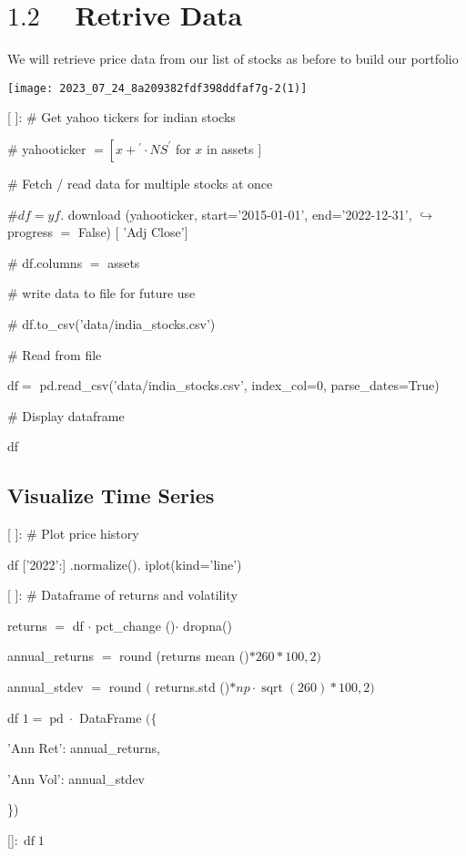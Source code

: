 \documentclass[10pt]{article}
\begin{document}
\section*{$1.2 \quad$ Retrive Data}
We will retrieve price data from our list of stocks as before to build our portfolio

\begin{center}
\texttt{[image: 2023\_07\_24\_8a209382fdf398ddfaf7g-2(1)]}
\end{center}

[ ]: \# Get yahoo tickers for indian stocks

\# yahooticker $=\left[x+{ }^{\prime} \cdot N S^{\prime}\right.$ for $x$ in assets $]$

\# Fetch / read data for multiple stocks at once

$\# d f=y f$. download (yahooticker, start='2015-01-01', end='2022-12-31', $\hookrightarrow$ progress $=$ False) $[$ 'Adj Close']

$\#$ df.columns $=$ assets

\# write data to file for future use

\# df.to\_csv('data/india\_stocks.csv')

\# Read from file

$\mathrm{df}=$ pd.read\_csv('data/india\_stocks.csv', index\_col=0, parse\_dates=True)

\# Display dataframe

df

\subsection*{Visualize Time Series}
[ ]: \# Plot price history

df ['2022':] .normalize(). iplot(kind='line')

[ ]: \# Dataframe of returns and volatility

returns $=$ df $\cdot$ pct\_change ()$\cdot$ dropna()

annual\_returns $=$ round (returns mean ()$* 260 * 100,2)$

annual\_stdev $=$ round $($ returns.std ()$* n p \cdot \operatorname{sqrt}(260) * 100,2)$

df $1=\operatorname{pd} \cdot$ DataFrame $(\{$

'Ann Ret': annual\_returns,

'Ann Vol': annual\_stdev

\})

[]$: \operatorname{df} 1$
\end{document}
